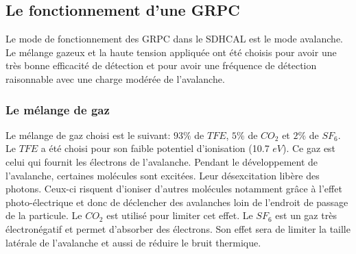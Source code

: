 \subsection{Le fonctionnement d'une GRPC}
Le mode de fonctionnement des GRPC dans le SDHCAL est le mode avalanche. Le mélange gazeux et la haute tension appliquée ont été choisis pour avoir une très bonne efficacité de détection et pour avoir une fréquence de détection raisonnable avec une charge modérée de l'avalanche. 
\subsubsection{Le mélange de gaz}
Le mélange de gaz choisi est le suivant: $93\%$ de $TFE$, $5\%$ de $CO_2$ et $2\%$ de $SF_6$. Le $TFE$ a été choisi pour son faible potentiel d'ionisation (10.7 $eV$). Ce gaz est celui qui fournit les électrons de l'avalanche. Pendant le développement de l'avalanche, certaines molécules sont excitées. Leur désexcitation libère des photons. Ceux-ci risquent d'ioniser d'autres molécules notamment grâce à l'effet photo-électrique et donc de déclencher des avalanches loin de l'endroit de passage de la particule. Le $CO_2$ est utilisé pour limiter cet effet. Le $SF_6$ est un gaz très électronégatif et permet d'absorber des électrons. Son effet sera de limiter la taille latérale de l'avalanche et aussi de réduire le bruit thermique.

